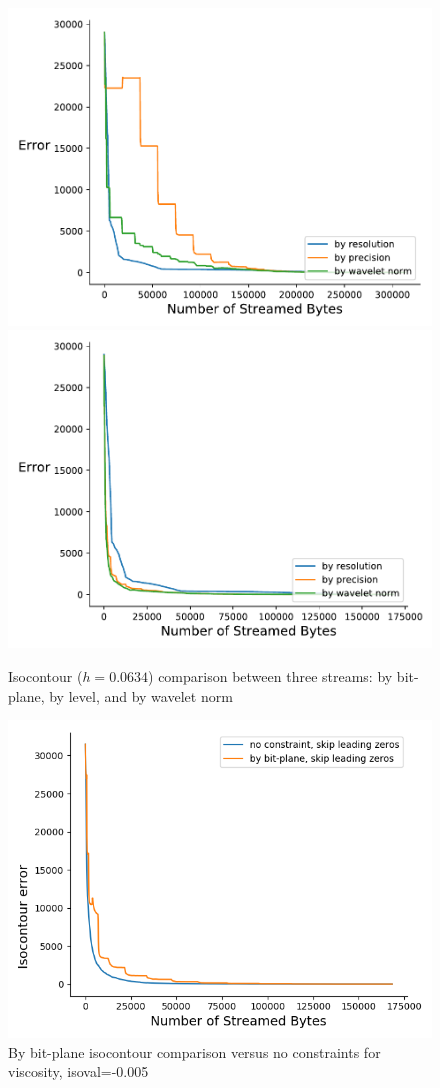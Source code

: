 \begin{figure}[htb!]
	\centering
	{\includegraphics[width=0.4\linewidth]{img/independent/isocontour-miranda-viscosity}}
	{\includegraphics[width=0.4\linewidth]{img/skip-zeros/isocontour-miranda-viscosity}}
	\caption {Isocontour ($h = 0.0634$) comparison between three streams: by bit-plane, by level, and by wavelet norm}
	\label{fig:isocontour_traditional_vs_by_norm_viscosity}
\end{figure}

\begin{figure}
  \centering
  \includegraphics[width=0.8\linewidth]{resources/isocontour-error-by-bit-plane-viscosity.png}
  \caption {By bit-plane isocontour comparison versus no constraints for viscosity, isoval=-0.005}
  \label{fig:by_bit_plane_isocontour}
\end{figure}
